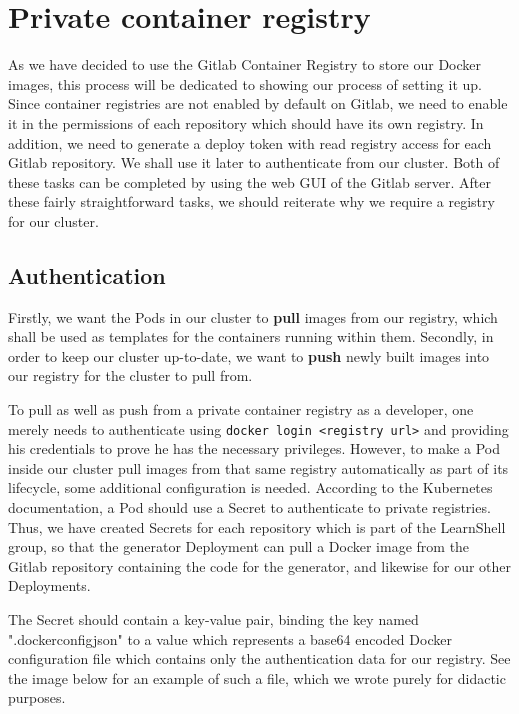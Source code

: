 \documentclass[thesis=B,english]{FITthesis}[2019/12/23]
\begin{document}
\section{Private container registry}

As we have decided to use the Gitlab Container Registry to store our Docker images, this process will be dedicated to showing our process of setting it up. 
Since container registries are not enabled by default on Gitlab, we need to enable it in the permissions of each repository which should have its own registry. In addition, we need to generate a deploy token with read registry access for each Gitlab repository. We shall use it later to authenticate from our cluster. Both of these tasks can be completed by using the web GUI of the Gitlab server. After these fairly straightforward tasks, we should reiterate why we require a registry for our cluster.

\subsection{Authentication}

Firstly, we want the Pods in our cluster to \textbf{pull} images from our registry, which shall be used as templates for the containers running within them. Secondly, in order to keep our cluster up-to-date, we want to \textbf{push} newly built images into our registry for the cluster to pull from. 

To pull as well as push from a private container registry as a developer, one merely needs to authenticate using \verb|docker login <registry url>| and providing his credentials to prove he has the necessary privileges. However, to make a Pod inside our cluster pull images from that same registry automatically as part of its lifecycle, some additional configuration is needed. According to the Kubernetes documentation, a Pod should use a Secret to authenticate to private registries. Thus, we have created Secrets for each repository which is part of the LearnShell group, so that the generator Deployment can pull a Docker image from the Gitlab repository containing the code for the generator, and likewise for our other Deployments.

The Secret should contain a key-value pair, binding the key named ".dockerconfigjson" to a value which represents a base64 encoded Docker configuration file which contains only the authentication data for our registry. See the image below for an example of such a file, which we wrote purely for didactic purposes.
\end{document}
